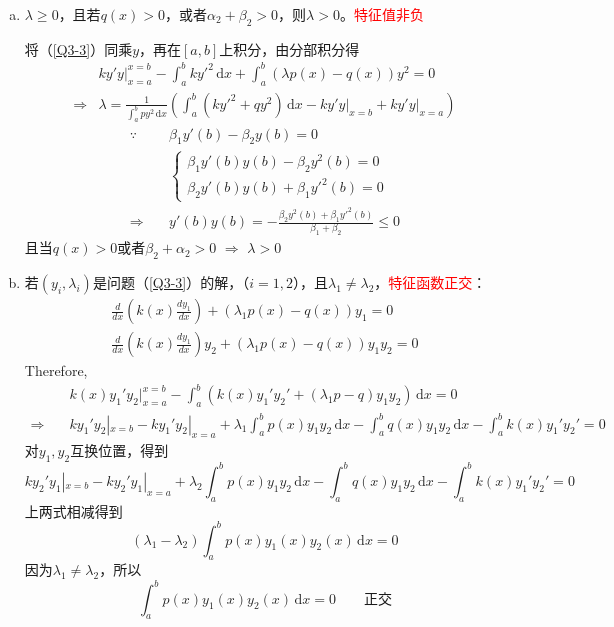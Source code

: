 \documentclass[11pt, a4paper]{article}
\theoremstyle{theorem}
\newcommand{\intd}[1]{\,\mathrm{d}{#1}}
\begin{document}
\begin{enumerate}[(a)]
    \item $\lambda \geq 0$，且若$q(x) > 0$，或者$\alpha_2 + \beta_2 >0$，则$\lambda > 0$。\textcolor{red}{特征值非负}

将（\ref{Q3-3}）同乘$y$，再在$[a,b]$上积分，由分部积分得
\begin{align*}
    &k y'y \bigg|_{x=a}^{x=b} - \int_a^b ky'^2 \intd x + \int_a^b \left(\lambda p(x) - q(x)\right) y^2 = 0 \\
    \Longrightarrow & \lambda = \frac{1}{\int_a^b py^2 \intd x} \left(\int_a^b (ky'^2 + qy^2) \intd x - k y' y \bigg|_{x=b} + ky'y\bigg|_{x=a} \right)
\end{align*}
\begin{align*}
\because \quad &\beta_1 y'(b) - \beta_2 y(b) = 0 \\
&\begin{cases}
\beta_1 y'(b) y(b) - \beta_2 y^2(b) = 0 \\
\beta_2 y'(b) y(b) + \beta_1 y'^2(b) = 0
\end{cases} \\
\Rightarrow \quad & y'(b) y(b) = - \frac{\beta_2 y^2(b) + \beta_1 y'^2(b)}{\beta_1 + \beta_2} \leq 0
\end{align*}
且当$q(x) > 0$或者$\beta_2 + \alpha_2 > 0$ \; $\Longrightarrow$ \; $\lambda > 0$

\item 若$(y_i, \lambda_i)$是问题（\ref{Q3-3}）的解，（$i = 1,2$），且$\lambda_1 \neq \lambda_2$，\textcolor{red}{特征函数正交}：
\begin{align}
    \frac{d}{dx} \left(k(x) \frac{dy_1}{d x}\right) + (\lambda_1 p(x) - q(x))y_1 = 0 \\
    \frac{d}{dx} \left(k(x) \frac{dy_1}{d x}\right)y_2 + (\lambda_1 p(x) - q(x))y_1y_2 = 0
\end{align}
Therefore,
\begin{align*}
    &k(x) y_1' y_2 \bigg|_{x=a}^{x=b} - \int_a^b \left(k(x) y_1' y_2' + (\lambda_1 p - q)y_1y_2\right) \intd x = 0 \\
    \Rightarrow \quad &k y_1'y_2 |_{x=b} - k y_1' y_2 |_{x=a} + \lambda_1 \int_a^b p(x)y_1 y_2 \intd x - \int_a^b q(x) y_1 y_2 \intd x - \int_a^b k(x) y_1' y_2' = 0
\end{align*}
对$y_1,y_2$互换位置，得到
$$
k y_2'y_1 |_{x=b} - k y_2' y_1 |_{x=a} + \lambda_2 \int_a^b p(x)y_1 y_2 \intd x - \int_a^b q(x) y_1 y_2 \intd x - \int_a^b k(x) y_1' y_2' = 0
$$
上两式相减得到
$$
\left(\lambda_1 - \lambda_2\right) \int_a^b p(x)y_1(x) y_2(x) \intd x = 0
$$
因为$\lambda_1 \neq \lambda_2$，所以
$$
\int_a^b p(x)y_1(x) y_2(x) \intd x = 0   \quad \quad \text{正交}
$$

\end{enumerate}
\end{document}
